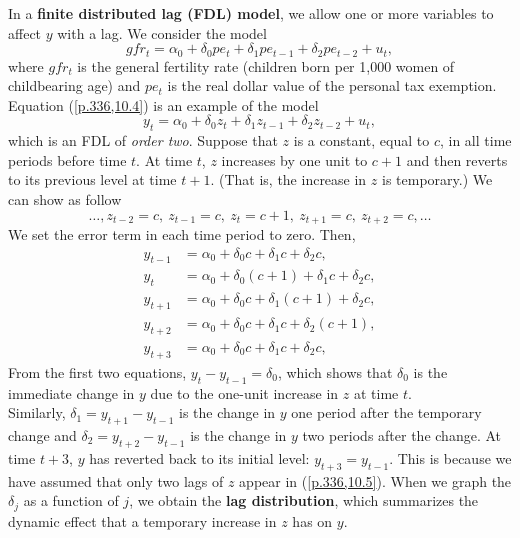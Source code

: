 \documentclass[a4paper, 10pt]{article}
\theoremstyle{definition}	%
\begin{document}
In a \textbf{finite distributed lag (FDL) model}, we allow one or more variables to affect \( y \) with a lag. We consider the model 
\begin{equation}
    gfr_t = \alpha_0 + \delta_0 pe_t + \delta_1 pe_{t-1} + \delta_2 pe_{t-2} + u_t, \label{p.336,10.4}
\end{equation}
where \( gfr_t \) is the general fertility rate (children born per 1,000 women of childbearing age) and \( pe_t \) is the real dollar value of the personal tax exemption.
Equation (\ref{p.336,10.4}) is an example of the model
\begin{equation}
    y_t = \alpha_0 + \delta_0 z_t + \delta_1 z_{t-1} + \delta_2 z_{t-2} + u_t, \label{p.336,10.5}
\end{equation}
which is an FDL of \textit{order two}. Suppose that \( z \) is a constant, equal to \( c \), in all time periods before time \( t \). At time \( t \), \( z \) increases by one unit to \( c+1 \) and then reverts to its previous level at time \( t+1 \). (That is, the increase in \( z \) is temporary.) We can show as follow
\[
\ldots, z_{t-2} = c,\ z_{t-1} = c, \ z_t = c+1, \ z_{t+1} = c, \ z_{t+2} = c, \dots
\]
We set the error term in each time period to zero. Then,
\begin{align*}
    y_{t-1} &= \alpha_0 + \delta_0 c + \delta_1 c + \delta_2 c, \\
    y_t &= \alpha_0 + \delta_0 (c + 1) + \delta_1 c + \delta_2 c, \\
    y_{t+1} &= \alpha_0 + \delta_0 c + \delta_1 (c + 1) + \delta_2 c, \\
    y_{t+2} &= \alpha_0 + \delta_0 c + \delta_1 c + \delta_2 (c + 1), \\
    y_{t+3} &= \alpha_0 + \delta_0 c + \delta_1 c + \delta_2 c,
\end{align*}
From the first two equations, \( y_t - y_{t-1} = \delta_0 \), which shows that \( \delta_0 \) is the immediate change in \( y \) due to the one-unit increase in \( z \) at time \( t \).\\
Similarly, \( \delta_1 = y_{t+1} - y_{t-1} \) is the change in \( y \) one period after the temporary change and \( \delta_2 = y_{t+2} - y_{t-1} \) is the change in \( y \) two periods after the change. At time \( t+3 \), \( y \) has reverted back to its initial level: \( y_{t+3} = y_{t-1} \). This is because we have assumed that only two lags of \( z \) appear in (\ref{p.336,10.5}). When we graph the \( \delta_j \) as a function of \( j \), we obtain the \textbf{lag distribution}, which summarizes the dynamic effect that a temporary increase in \( z \) has on \( y \).\\
\end{document}
